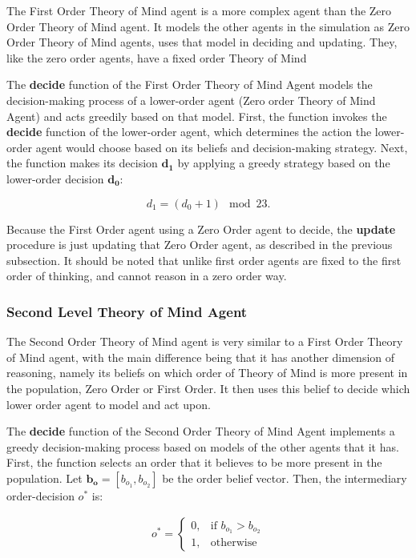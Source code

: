The First Order Theory of Mind agent is a more complex agent than the Zero Order Theory of Mind agent. It models the other agents in the simulation as Zero Order Theory of Mind agents, uses that model in deciding and updating. They, like the zero order agents, have a fixed order Theory of Mind

The \textbf{decide} function of the First Order Theory of Mind Agent models the decision-making process of a lower-order agent (Zero order Theory of Mind Agent) and acts greedily based on that model. First, the function invokes the \textbf{decide} function of the lower-order agent, which determines the action the lower-order agent would choose based on its beliefs and decision-making strategy. Next, the function makes its decision $\mathbf{d_1}$ by applying a greedy strategy based on the lower-order decision \hyperref[eq:zero-order-decide]{$\mathbf{d_0}$}:

\[
d_1 = (d_0 + 1) \mod 23.
\]

Because the First Order agent using a Zero Order agent to decide, the \textbf{update} procedure is just updating that Zero Order agent, as described in the previous subsection. It should be noted that unlike \cite{veltman2019training} first order agents are fixed to the first order of thinking, and cannot reason in a zero order way.

\subsubsection{Second Level Theory of Mind Agent}

The Second Order Theory of Mind agent is very similar to a First Order Theory of Mind agent, with the main difference being that it has another dimension of reasoning, namely its beliefs on which order of Theory of Mind is more present in the population, Zero Order or First Order. It then uses this belief to decide which lower order agent to model and act upon. 

The \textbf{decide} function of the Second Order Theory of Mind Agent implements a greedy decision-making process based on models of the other agents that it has. First, the function selects an order that it believes to be more present in the population. Let $\mathbf{b_o} = [b_{o_{1}}, b_{o_{2}}]$ be the order belief vector. Then, the intermediary order-decision $o^*$ is:

\[
\begin{aligned}
\text{{$o^*$}} =
\begin{cases}
0, & \text{{if }} b_{o_{1}} > b_{o_{2}}\\
1, & \text{{otherwise}}
\end{cases}
\end{aligned}
\]

